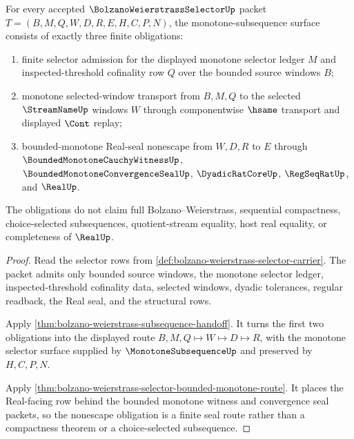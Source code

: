 \begin{theorem}
\label{thm:bolzanoweierstrassselector-monotone-subsequence-obligations}
For every accepted $\BolzanoWeierstrassSelectorUp$ packet $T=(B,M,Q,W,D,R,E,H,C,P,N)$, the monotone-subsequence surface consists of exactly three finite obligations:
\begin{enumerate}
\item finite selector admission for the displayed monotone selector ledger $M$ and inspected-threshold cofinality row $Q$ over the bounded source windows $B$;
\item monotone selected-window transport from $B,M,Q$ to the selected $\StreamNameUp$ windows $W$ through componentwise $\hsame$ transport and displayed $\Cont$ replay;
\item bounded-monotone Real-seal nonescape from $W,D,R$ to $E$ through $\BoundedMonotoneCauchyWitnessUp$, $\BoundedMonotoneConvergenceSealUp$, $\DyadicRatCoreUp$, $\RegSeqRatUp$, and $\RealUp$.
\end{enumerate}
The obligations do not claim full Bolzano--Weierstrass, sequential compactness, choice-selected subsequences, quotient-stream equality, host real equality, or completeness of $\RealUp$.
\end{theorem}
\begin{proof}
Read the selector rows from \autoref{def:bolzano-weierstrass-selector-carrier}. The packet admits only bounded source windows, the monotone selector ledger, inspected-threshold cofinality data, selected windows, dyadic tolerances, regular readback, the Real seal, and the structural rows.

Apply \autoref{thm:bolzano-weierstrass-subsequence-handoff}. It turns the first two obligations into the displayed route $B,M,Q\longmapsto W\longmapsto D\longmapsto R$, with the monotone selector surface supplied by $\MonotoneSubsequenceUp$ and preserved by $H,C,P,N$.

Apply \autoref{thm:bolzano-weierstrass-selector-bounded-monotone-route}. It places the Real-facing row behind the bounded monotone witness and convergence seal packets, so the nonescape obligation is a finite seal route rather than a compactness theorem or a choice-selected subsequence.
\end{proof}


